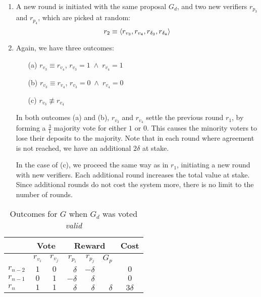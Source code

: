 \begin{enumerate}
    \item A new round is initiated with the same proposal $G_d$, and two new
        verifiers $r_{p_3}$ and $r_{p_4}$, which are picked at random:
        \begin{equation*}
            r_2 \equiv \langle r_{v_3}, r_{v_4}, r_{\delta_3}, r_{\delta_4} \rangle
        \end{equation*}
    \item Again, we have three outcomes:
        \smallskip
        \begin{enumerate}
            \item[(a)] $r_{v_3} \equiv r_{v_4}$, \qquad $r_{v_3} = 1 \; \wedge \; r_{v_4} = 1$
            \item[(b)] $r_{v_3} \equiv r_{v_4}$, \qquad $r_{v_3} = 0 \; \wedge \; r_{v_4} = 0$
            \item[(c)] $r_{v_3} \not\equiv r_{v_4}$
        \end{enumerate}
        \smallskip
        In both outcomes (a) and (b), $r_{v_3}$ and $r_{v_4}$ settle the
        previous round $r_1$, by forming a $\frac{3}{1}$ majority vote for
        either $1$ or $0$. This causes the minority voters to lose their
        deposits to the majority. Note that in each round where agreement is
        not reached, we have an additional $2\delta$ at stake.

        In the case of (c), we proceed the same way as in $r_1$, initiating a
        new round with new verifiers.  Each additional round increases the
        total value at stake. Since additional rounds do not cost the system
        more, there is no limit to the number of rounds.
\end{enumerate}

\begin{table}[hbt]
    \caption{Outcomes for $G$ when $G_d$ was voted \emph{valid}}
    \begin{tabular}{lccrrrc}
    \toprule
        \hspace   & \multicolumn{2}{c}{Vote} & \multicolumn{3}{c}{Reward} & Cost                    \\
    \midrule
        \hspace   & $r_{v_i}$  & $r_{v_j}$   & $r_{p_i}$ & $r_{p_j}$ & $G_p$    &                   \\
    \addlinespace[0.5em]
        $r_{n-2}$ & $1$        & $0$         & $\delta$  & $-\delta$ &          & $0$               \\
        $r_{n-1}$ & $0$        & $1$         & $-\delta$ & $\delta$  &          & $0$               \\
        $r_{n}$   & $1$        & $1$         & $\delta$  & $\delta$  & $\delta$ & $3\delta$         \\
    \bottomrule
    \end{tabular}
\end{table}

